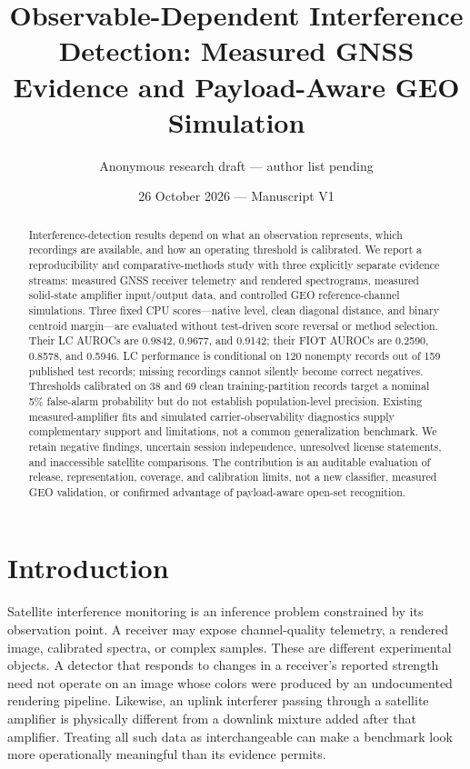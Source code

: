 \documentclass[
  10pt,
]{article}
\title{Observable-Dependent Interference Detection: Measured GNSS
Evidence and Payload-Aware GEO Simulation}
\author{Anonymous research draft --- author list pending}
\date{26 October 2026 --- Manuscript V1}
\begin{document}
\maketitle
\begin{abstract}
Interference-detection results depend on what an observation represents,
which recordings are available, and how an operating threshold is
calibrated. We report a reproducibility and comparative-methods study
with three explicitly separate evidence streams: measured GNSS receiver
telemetry and rendered spectrograms, measured solid-state amplifier
input/output data, and controlled GEO reference-channel simulations.
Three fixed CPU scores---native level, clean diagonal distance, and
binary centroid margin---are evaluated without test-driven score
reversal or method selection. Their LC AUROCs are 0.9842, 0.9677, and
0.9142; their FIOT AUROCs are 0.2590, 0.8578, and 0.5946. LC performance
is conditional on 120 nonempty records out of 159 published test
records; missing recordings cannot silently become correct negatives.
Thresholds calibrated on 38 and 69 clean training-partition records
target a nominal 5\% false-alarm probability but do not establish
population-level precision. Existing measured-amplifier fits and
simulated carrier-observability diagnostics supply complementary support
and limitations, not a common generalization benchmark. We retain
negative findings, uncertain session independence, unresolved license
statements, and inaccessible satellite comparisons. The contribution is
an auditable evaluation of release, representation, coverage, and
calibration limits, not a new classifier, measured GEO validation, or
confirmed advantage of payload-aware open-set recognition.
\end{abstract}

\section{Introduction}\label{introduction}

Satellite interference monitoring is an inference problem constrained by
its observation point. A receiver may expose channel-quality telemetry,
a rendered image, calibrated spectra, or complex samples. These are
different experimental objects. A detector that responds to changes in a
receiver's reported strength need not operate on an image whose colors
were produced by an undocumented rendering pipeline. Likewise, an uplink
interferer passing through a satellite amplifier is physically different
from a downlink mixture added after that amplifier. Treating all such
data as interchangeable can make a benchmark look more operationally
meaningful than its evidence permits.
\end{document}

